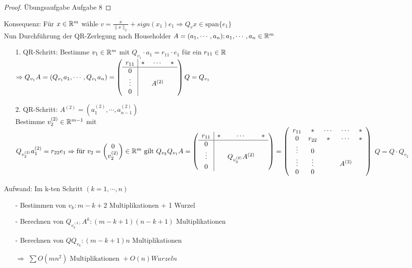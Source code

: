 \begin{proof}
	Übungsaufgabe Aufgabe 8
\end{proof}
Konsequenz: Für $x \in \mathbb R^m$ wähle $v=\frac{x}{\|x\|_2}+ sign(x_1)e_1
\Rightarrow Q_vx \in \text{span}\{e_1\}$\\
\newline
Nun Durchführung der QR-Zerlegung nach Householder $A=(a_1,\cdots,a_n); a_1,\cdots,a_n \in \mathbb R^m$\\
\begin{itemize}
	\item[1.]QR-Schritt: Bestimme $v_1 \in\mathbb R^m$ mit $Q_{v_1}\cdot a_1 = r_{11}\cdot e_1$ für ein $r_{11} \in \mathbb R$\\\newline
	$\Rightarrow Q_{v_1}A=(Q_{v_1}a_1,\cdots,Q_{v_1}a_n) =\left(
	\begin{array}{c|ccc} r_{11} & * & \cdots & *\\ \hline
						 0 & & & \\
						 \vdots & &A^{(2)} &\\
						 0 & & &
	\end{array}\right)\\ Q=Q_{v_1}$
	\item[2.]QR-Schritt: $A^{(2)}= \left(a_1^{(2)},\cdots,a_{n-1}^{(2)}\right)$\\
			Bestimme $v_2^{(2)} \in \mathbb R^{m-1}$ mit $Q_{v_2^{(2)}}a_1^{(2)} = r_{22}e_1\\
			\Rightarrow \text{für } v_2 = \begin{pmatrix}0\\v_2^{(2)}\end{pmatrix}\in \mathbb R^m \text{ gilt } Q_{v_2}Q_{v_1}A=\left(
			\begin{array}{c|ccc} r_{11} & * & \cdots & *\\ \hline
			0 & & & \\
			\vdots & &Q_{v_2^{(2)}}A^{(2)} &\\
			0 & & &
			\end{array}\right) = \left(
			\begin{array}{ccccc} r_{11} & * & \cdots &\cdots & *\\
			0 & r_{22} & * & \cdots & *\\
			\vdots & 0 & &\\
			\vdots & \vdots& &A^{(3)}\\
			0 & 0 & &
			\end{array}\right)$
			$Q=Q\cdot Q_{v_2}$\\
\end{itemize}
Aufwand: Im k-ten Schritt $(k=1, \cdots,n)$
		\begin{itemize}
			\item[-]Bestimmen von $v_k: m-k+2$ Multiplikationen + 1 Wurzel
			\item[-]Berechnen von $Q_{v_k^{(k)}}A^k: (m-k+1)(n-k+1)$ Multiplikationen
			\item[-] Berechnen von $QQ_{v_k}: (m-k+1)n$ Multiplikationen\\
			\item[$\Rightarrow$]$\sum O(mn^2) \text{ Multiplikationen } + O(n) Wurzeln$
		\end{itemize}\hfill\\
		
